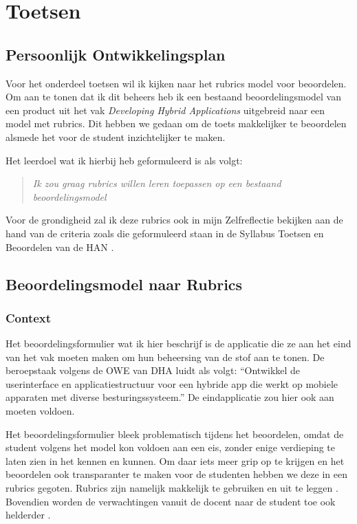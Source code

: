 \section{Toetsen}

\subsection{Persoonlijk Ontwikkelingsplan}
Voor het onderdeel toetsen wil ik kijken naar het rubrics model voor beoordelen. Om aan te tonen dat ik dit beheers heb ik een bestaand beoordelingsmodel van een product uit het vak \textit{Developing Hybrid Applications} uitgebreid naar een model met rubrics. Dit hebben we gedaan om de toets makkelijker te beoordelen alsmede het voor de student inzichtelijker te maken.

Het leerdoel wat ik hierbij heb geformuleerd is als volgt:
\begin{quote}
 \textit{Ik zou graag rubrics willen leren toepassen op een bestaand beoordelingsmodel}
\end{quote}
Voor de grondigheid zal ik deze rubrics ook in mijn Zelfreflectie bekijken aan de hand van de criteria zoals die geformuleerd staan in de Syllabus Toetsen en Beoordelen van de HAN \cite{syllabushan}.

\subsection{Beoordelingsmodel naar Rubrics}
\subsubsection{Context}
Het beoordelingsformulier wat ik hier beschrijf is de applicatie die ze aan het eind van het vak moeten maken om hun beheersing van de stof aan te tonen.
De beroepstaak volgens de OWE van DHA luidt als volgt: ``Ontwikkel de userinterface en applicatiestructuur voor een hybride app die werkt op mobiele apparaten met diverse besturingssysteem.'' De eindapplicatie zou hier ook aan moeten voldoen.

Het beoordelingsformulier bleek problematisch tijdens het beoordelen, omdat de student volgens het model kon voldoen aan een eis, zonder enige verdieping te laten zien in het kennen en kunnen. Om daar iets meer grip op te krijgen en het beoordelen ook transparanter te maken voor de studenten hebben we deze in een rubrics gegoten. Rubrics zijn namelijk makkelijk te gebruiken en uit te leggen \cite{andrade1997understanding}. Bovendien worden de verwachtingen vanuit de docent naar de student toe ook helderder \cite{andrade2000using}.

